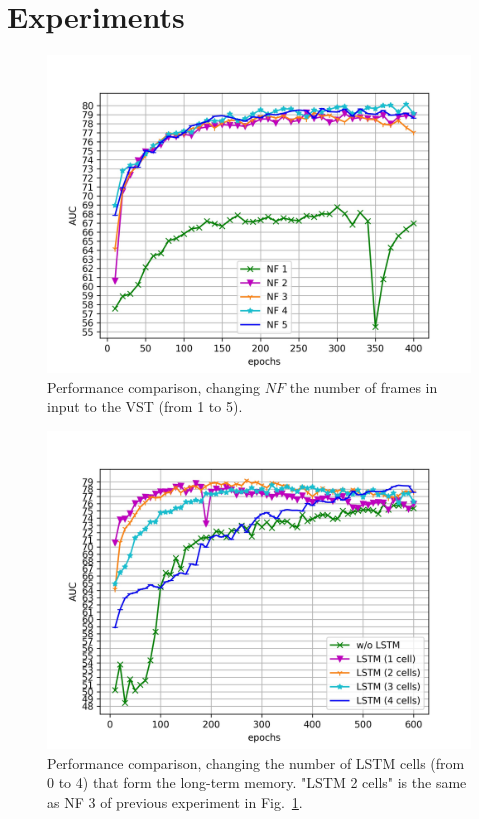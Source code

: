 \section{Experiments}
\label{sec:experiments}

\begin{figure}[t]
\centering
	\includegraphics[trim=0 0 0 0, clip, width=1.\linewidth]{images/exp_1.jpg}
	\caption{Performance comparison, changing $NF$ the number of frames in input to the VST  (from 1 to 5).}
	\label{fig:num-frames-vst}
\end{figure}

\begin{figure}[t]
\centering
	\includegraphics[trim=0 0 0 0, clip, width=1.\linewidth]{images/exp_2.jpg}
	\caption{Performance comparison, changing the number of LSTM cells (from 0 to 4) that form the long-term memory. "LSTM 2 cells" is the same as NF 3 of previous experiment in Fig.~\ref{fig:num-frames-vst}.}
	\label{fig:num-memory-cells}
\end{figure}

